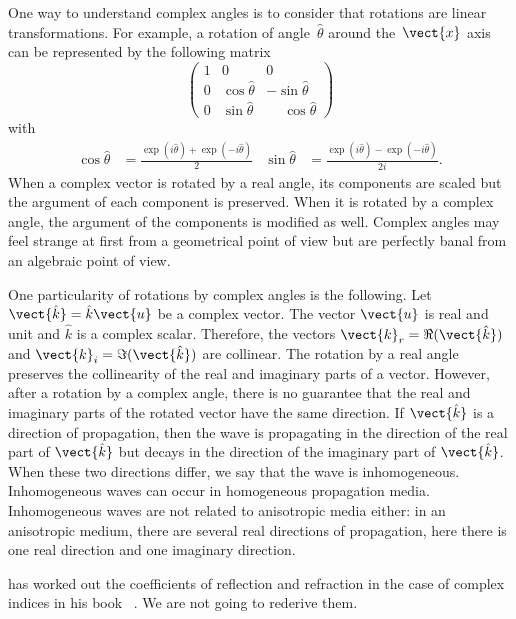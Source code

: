 One way to understand complex angles is to consider that rotations are linear transformations.
For example, a rotation of angle~$\hat{\theta}$ around the~$\vect{x}$ axis can be represented by the following matrix
\begin{equation}
    \begin{pmatrix}
        1 & 0 & 0\\
        0 & \cos \hat{\theta} & - \sin \hat{\theta} \\
        0 & \sin \hat{\theta} & \phantom{-}\cos \hat{\theta}
    \end{pmatrix}
\end{equation}
with
\begin{align}
    \cos{\hat{\theta}} &= \frac{\exp(i\hat{\theta}) + \exp(-i\hat{\theta})}{2}
    &
    \sin{\hat{\theta}} &= \frac{\exp(i\hat{\theta}) - \exp(-i\hat{\theta})}{2i}%
    \text{.}
\end{align}
When a complex vector is rotated by a real angle, its components are scaled but the argument of each component is preserved.
When it is rotated by a complex angle, the argument of the components is modified as well.
Complex angles may feel strange at first from a geometrical point of view but are perfectly banal from an algebraic point of view.

One particularity of rotations by complex angles is the following.
Let $\vect{\hat{k}} = \hat{k} \vect{u}$ be a complex vector.
The vector $\vect{u}$ is real and unit and $\hat{k}$ is a complex scalar.
Therefore, the vectors $\vect{k}_r = \Re(\vect{\hat{k}})$ and $\vect{k}_i = \Im(\vect{\hat{k}})$ are collinear.
The rotation by a real angle preserves the collinearity of the real and imaginary parts of a vector.
However, after a rotation by a complex angle, there is no guarantee that the real and imaginary parts of the rotated vector have the same direction.
If $\vect{\hat{k}}$ is a direction of propagation, then the wave is propagating in the direction of the real part of $\vect{\hat{k}}$ but decays in the direction of the imaginary part of $\vect{\hat{k}}$.
When these two directions differ, we say that the wave is inhomogeneous.
Inhomogeneous waves can occur in homogeneous propagation media.
Inhomogeneous waves are not related to anisotropic media either: in an anisotropic medium, there are several real directions of propagation, here there is one real direction and one imaginary direction.

\citeauthor{stratton1941electromagnetic} has worked out the coefficients of reflection and refraction in the case of complex indices in his book ~\cite{stratton1941electromagnetic}.
We are not going to rederive them.


